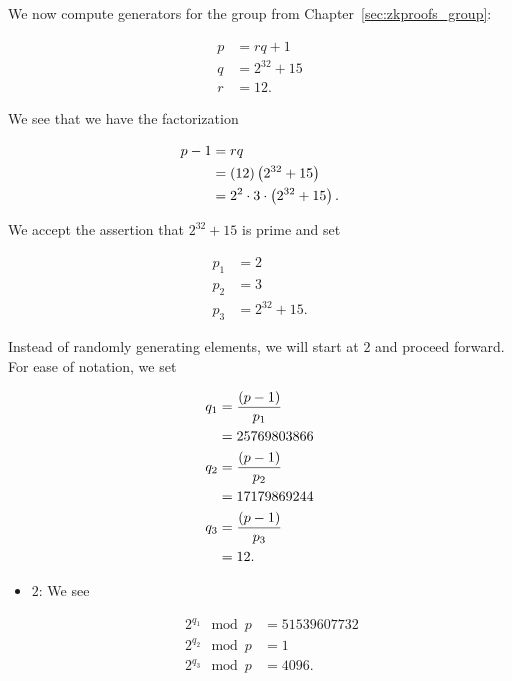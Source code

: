 \begin{example}
\label{example:app_math_finite_generator_zkproofs_group}

We now compute generators for the \gls{group}
from Chapter~\ref{sec:zkproofs_group}:

\begin{align}
    p &= rq + 1 \nonumber\\
    q &= 2^{32} + 15 \nonumber\\
    r &= 12.
\end{align}

\noindent
We see that we have the factorization

\begin{align}
    p-1 &= rq \nonumber\\
        &= \left( 12 \right)\left( 2^{32} + 15 \right) \nonumber\\
        &= 2^{2}\cdot 3 \cdot \left( 2^{32} + 15 \right).
\end{align}

\noindent
We accept the assertion that $2^{32}+15$ is prime
and set

\begin{align}
    p_{1} &= 2 \nonumber\\
    p_{2} &= 3 \nonumber\\
    p_{3} &= 2^{32} + 15.
\end{align}

Instead of randomly generating elements, we will start at $2$
and proceed forward.
For ease of notation, we set

\begin{align}
    q_{1} &= \frac{\left( p-1 \right)}{p_{1}} \nonumber\\
        &= 25769803866
            \nonumber\\
    q_{2} &= \frac{\left( p-1 \right)}{p_{2}} \nonumber\\
        &= 17179869244
            \nonumber\\
    q_{3} &= \frac{\left( p-1 \right)}{p_{3}} \nonumber\\
        &= 12.
\end{align}

\begin{itemize}
\item $2$: We see

\begin{align}
    2^{q_{1}} \mod p &= 51539607732
        \nonumber\\
    2^{q_{2}} \mod p &= 1
        \nonumber\\
    2^{q_{3}} \mod p &= 4096.
\end{align}


\end{itemize}
\end{example}
